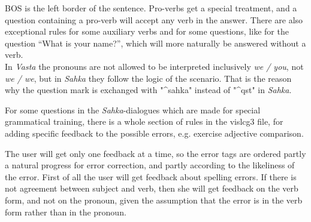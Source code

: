 \documentclass[11pt]{article}
\begin{document}
BOS is the left border of the sentence. Pro-verbs get a special treatment, and a question containing a pro-verb will accept any verb in the answer. There are also exceptional rules for some auxiliary verbs and for some questions, like for the question “What is your name?”, which will more naturally be answered without a verb. \\




In \textit{Vasta} the pronouns are not allowed to be interpreted inclusively \textit{we / you}, not \textit{we / we}, but in \textit{Sahka} they follow the logic of the scenario. That is the reason why the question mark is exchanged with "\^{}sahka" instead of "\^{}qst" in \textit{Sahka}.

For some questions in the \textit{Sahka}-dialogues which are made for special grammatical training, there is a whole section of rules in the vislcg3 file, for adding specific feedback to the possible errors, e.g. exercise adjective comparison.

The user will get only one feedback at a time, so the error tags are ordered partly a natural progress for error correction, and partly according to the likeliness of the error. First of all the user will get feedback about spelling errors. If there is not agreement between subject and verb, then she will get feedback on the verb form, and not on the pronoun, given the assumption that the error is in the verb form rather than in the pronoun.
\end{document}
